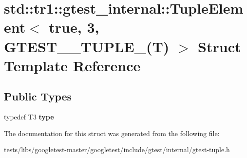 \hypertarget{structstd_1_1tr1_1_1gtest__internal_1_1TupleElement_3_01true_00_013_00_01GTEST__10__TUPLE___07T_08_01_4}{}\section{std\+:\+:tr1\+:\+:gtest\+\_\+internal\+:\+:Tuple\+Element$<$ true, 3, G\+T\+E\+S\+T\+\_\+\_\+\+T\+U\+P\+L\+E\+\_\+(T) $>$ Struct Template Reference}
\label{structstd_1_1tr1_1_1gtest__internal_1_1TupleElement_3_01true_00_013_00_01GTEST__10__TUPLE___07T_08_01_4}
\subsection*{Public Types}
\begin{DoxyCompactItemize}
\item 
\mbox{\label{structstd_1_1tr1_1_1gtest__internal_1_1TupleElement_3_01true_00_013_00_01GTEST__10__TUPLE___07T_08_01_4_a0abc8519ff756a7736076063626a2718}} 
typedef T3 {\bfseries type}
\end{DoxyCompactItemize}


The documentation for this struct was generated from the following file\+:\begin{DoxyCompactItemize}
\item 
tests/libs/googletest-\/master/googletest/include/gtest/internal/gtest-\/tuple.\+h\end{DoxyCompactItemize}
